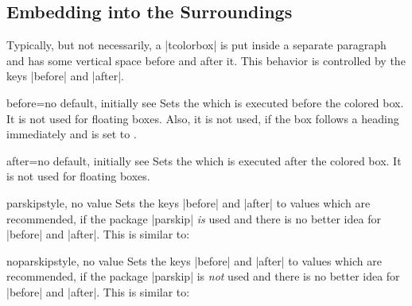 \clearpage
\subsection{Embedding into the Surroundings}\label{subsec:surroundings}
Typically, but not necessarily, a |tcolorbox| is put inside a separate paragraph
and has some vertical space before and after it.
This behavior is controlled by the keys |before| and |after|.

\begin{docTcbKey}{before}{=}{no default, initially see }
  Sets the  which is executed before the colored box.
  It is not used for floating boxes.
  Also, it is not used, if the box follows a heading immediately
  and  is set to .
\end{docTcbKey}

\begin{docTcbKey}{after}{=}{no default, initially see }
  Sets the  which is executed after the colored box.
  It is not used for floating boxes.
\end{docTcbKey}

\begin{docTcbKey}{parskip}{}{style, no value}
  Sets the keys |before| and |after| to values which are
  recommended, if the package |parskip| \emph{is} used and there is no better
  idea for |before| and |after|. This is similar to:
\begin{dispListing}
\end{dispListing}
\end{docTcbKey}

\begin{docTcbKey}[][doc updated=2016-02-14]{noparskip}{}{style, no value}
  Sets the keys |before| and |after| to values which are
  recommended, if the package |parskip| is \emph{not} used and there is no better
  idea for |before| and |after|. This is similar to:
\begin{dispListing}
\end{dispListing}
\end{docTcbKey}

